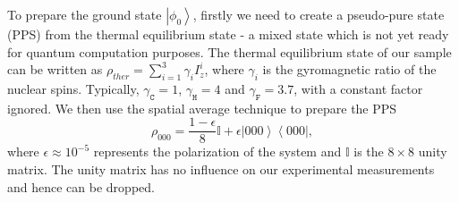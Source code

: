 \documentclass[twocolumn,showpacs,twoside,10pt,prl]{revtex4}
\begin{document}
To prepare the ground state $\left\vert \phi_{0} \right\rangle$, firstly we need to create a pseudo-pure state (PPS) from the thermal equilibrium state - a mixed state which is not yet ready for quantum computation purposes. The thermal equilibrium state of our sample can be written as $\rho_{ther}=\sum\limits_{i=1}^3 \gamma_i I_z^i$,
where $\gamma_i$ is the gyromagnetic ratio of the nuclear spins. Typically, $\gamma_\texttt{C}=1$, $\gamma_\texttt{H}=4$ and $\gamma_\texttt{F}=3.7$, with a constant factor ignored. We then use the spatial average technique \cite{spatial-2} to prepare the PPS
\begin{equation}\label{ppsform}
\rho_{000}=\frac{1-\epsilon}{8}\mathbb{{I}}+\epsilon \left\vert 000 \right\rangle \left\langle000\right\vert,
\end{equation}
where $\epsilon \approx 10^{-5}$ represents the polarization of the system and ${\mathbb{{I}}}$ is the $8\times8$ unity matrix. The unity matrix
has no influence on our experimental measurements and hence can be dropped.
\end{document}

